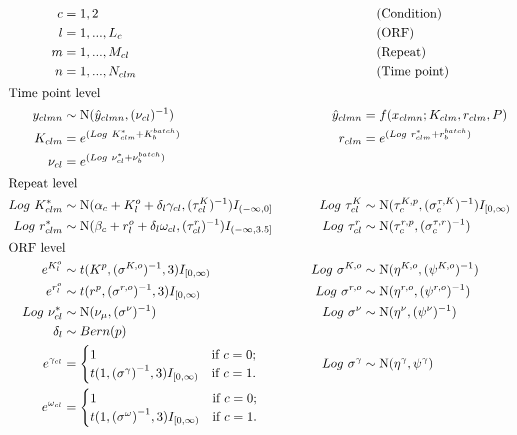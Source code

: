 \documentclass[11pt,a4paper]{article}
\begin{document}
\begin{align*}
c&=1,2  &&\;\;\;\; \text{(Condition)}\\
l&=1,...,L_{c}   &&\;\;\;\; \text{(ORF)}\\
m&=1,...,M_{cl}       &&\;\;\;\; \text{(Repeat)}\\
n&=1,...,N_{clm}      &&\;\;\;\; \text{(Time point)}\\
\intertext{Time point level}
y_{clmn} &\sim \operatorname{N}(\hat{y}_{clmn},({\nu_{cl}})^{-1} )\quad
&\hat{y}_{clmn} &= f(x_{clmn};{ K_{clm} } ,{ r_{clm} } , { P })\\
K_{clm}&=e^{(Log~K^{*}_{clm}+K^{batch}_{b})} \qquad & r_{clm}&=e^{(Log~r^{*}_{clm}+r^{batch}_{b})} \\
\nu_{cl} &=e^{(Log~\nu^{*}_{cl}+\nu^{batch}_{b})} \\
\intertext{Repeat level}
Log~K^{*}_{clm} &\sim \operatorname{N}(\alpha_{c}+K_{l}^o+\delta_{l}\gamma_{cl},({ \tau_{cl}^K })^{-1})I_{(-\infty,0]}
\qquad & Log~\tau_{cl}^K &\sim \operatorname{N}(\tau^{K,p}_{c}, ({\sigma^{\tau,K}_{c}})^{-1} )I_{[0,\infty)}\\
Log~r^{*}_{clm} &\sim \operatorname{N}(\beta_{c}+r_{l}^o+\delta_{l}\omega_{cl},({ \tau_{cl}^r })^{-1})I_{(-\infty,3.5]}
\qquad &Log~\tau_{cl}^r &\sim \operatorname{N}(\tau^{r,p}_{c}, ({\sigma^{\tau,r}_{c}})^{-1} )\\
\intertext{ORF level}
e^{K_{l}^o} &\sim t(K^p, ({ \sigma^{K,o} })^{-1},3 )I_{[0,\infty)}\qquad &Log~\sigma^{K,o} &\sim \operatorname{N}(\eta^{K,o}, (\psi^{K,o})^{-1} )\\
e^{r_{l}^o} &\sim t(r^p, ({ \sigma^{r,o} })^{-1},3 )I_{[0,\infty)}\qquad &Log~\sigma^{r,o} &\sim \operatorname{N}(\eta^{r,o}, (\psi^{r,o})^{-1} )\\
Log~\nu^{*}_{cl} &\sim \operatorname{N}(\nu_{\mu},({ \sigma^{\nu} })^{-1})\qquad& Log~\sigma^{\nu} &\sim \operatorname{N}(\eta^{\nu}, (\psi^{\nu})^{-1} )\\
\delta_{l} &\sim Bern(p)\\
e^{\gamma_{cl}}&=\begin{cases}
1  & \text{if } c=0;\\
t(1,{({\sigma^{\gamma}})}^{-1},3)I_{[0,\infty)} & \text{if } c=1.
\end{cases}
\qquad
&Log~\sigma^{\gamma}&\sim
\operatorname{N}(\eta^{\gamma},\psi^{\gamma})  
\\
e^{\omega_{cl}}&=\begin{cases}
1  & \text{if } c=0;\\
t(1,({{\sigma^{\omega}})}^{-1},3)I_{[0,\infty)} & \text{if } c=1.

\end{cases}
\end{align*}
\end{document}
